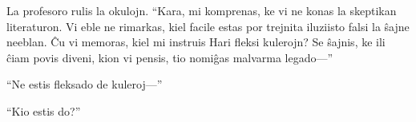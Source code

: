 La profesoro rulis la okulojn.
“Kara, mi komprenas, ke vi ne konas la skeptikan literaturon.
Vi eble ne rimarkas, kiel facile estas por trejnita iluziisto falsi la ŝajne neeblan.
Ĉu vi memoras, kiel mi instruis Hari fleksi kulerojn?
Se ŝajnis, ke ili ĉiam povis diveni, kion vi pensis, tio nomiĝas malvarma legado—”

“Ne estis fleksado de kuleroj—”

“Kio estis do?”







